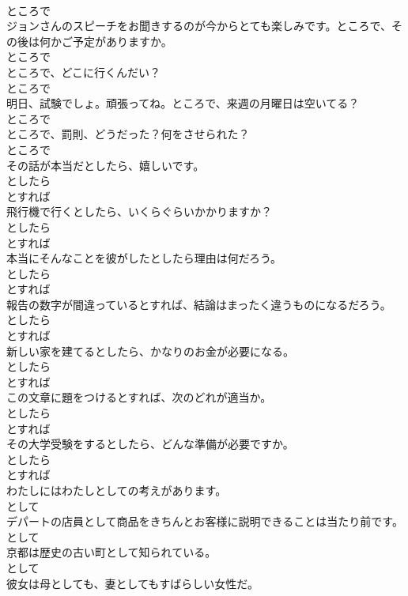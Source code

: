 \documentclass[8pt]{extreport}
\begin{document}
\begin{CJK}{UTF8}{min}
\\	ところで
\\	ジョンさんのスピーチをお聞きするのが今からとても楽しみです。ところで、その後は何かご予定がありますか。	
\\	ところで
\\	ところで、どこに行くんだい？	
\\	ところで
\\	明日、試験でしょ。頑張ってね。ところで、来週の月曜日は空いてる？	
\\	ところで
\\	ところで、罰則、どうだった？何をさせられた？	
\\	ところで
\\	その話が本当だとしたら、嬉しいです。	
\\	としたら 
\\	とすれば
\\	飛行機で行くとしたら、いくらぐらいかかりますか？	
\\	としたら 
\\	とすれば
\\	本当にそんなことを彼がしたとしたら理由は何だろう。	
\\	としたら 
\\	とすれば
\\	報告の数字が間違っているとすれば、結論はまったく違うものになるだろう。	
\\	としたら 
\\	とすれば
\\	新しい家を建てるとしたら、かなりのお金が必要になる。	
\\	としたら 
\\	とすれば
\\	この文章に題をつけるとすれば、次のどれが適当か。	
\\	としたら 
\\	とすれば
\\	その大学受験をするとしたら、どんな準備が必要ですか。	
\\	としたら 
\\	とすれば
\\	わたしにはわたしとしての考えがあります。	
\\	として
\\	デパートの店員として商品をきちんとお客様に説明できることは当たり前です。	
\\	として
\\	京都は歴史の古い町として知られている。	
\\	として
\\	彼女は母としても、妻としてもすばらしい女性だ。	

\end{CJK}
\end{document}
